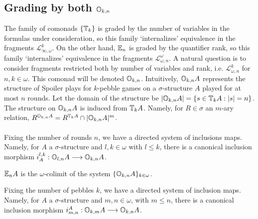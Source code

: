 \subsection{Grading by both ${\mathbb{O}_{k,n}}$}\label{sec:grading}
The family of comonads $\{{\mathbb{T}_{k}}\}$ is graded by the number of variables in the formulas under consideration, so this family `internalizes' equivalence in the fragments $\mathcal{L}^{k}_{\infty,\omega}$. On the other hand, ${\mathbb{E}_{n}}$ is graded by the quantifier rank, so this family `internalizes' equivalence in the fragments $\mathcal{L}^{\omega}_{\omega,n}$. A natural question is to consider fragments restricted both by number of variables and rank, i.e. $\mathcal{L}^{k}_{\omega,n}$ for $n,k \in \omega$. This comonad will be denoted ${\mathbb{O}_{k,n}}$. Intuitively, ${\mathbb{O}_{k,n}A}$ represents the structure of Spoiler plays for $k$-pebble games on a $\sigma$-structure $A$ played for at most $n$ rounds. Let the domain of the structure be $|{\mathbb{O}_{k,n}A}| = \{s \in {\mathbb{T}_{k}A}: |s| = n\}$. The structure on ${\mathbb{O}_{k,n}A}$ is induced from ${\mathbb{T}_{k}A}$. Namely, for $R \in \sigma$ an $m$-ary relation, $R^{{\mathbb{O}_{k,n}A}} = R^{{\mathbb{T}_{k}A}} \cap |{\mathbb{O}_{k,n}A}|^{m}$. 
\\~\\
Fixing the number of rounds $n$, we have a directed system of inclusions maps. Namely, for $A$ a $\sigma$-structure and $l,k \in \omega$ with $l \leq k$, there is a canonical inclusion morphism $i^{l,k}_{A}:{\mathbb{O}_{l,n}A} \longrightarrow {\mathbb{O}_{k,n}A}$. \\  
\begin{prop}
${\mathbb{E}_{n}A}$ is the $\omega$-colimit of the system $\{{\mathbb{O}_{k,n}A}\}_{k \in \omega}$.
\end{prop}
Fixing the number of pebbles $k$, we have a directed system of inclusion maps. Namely, for $A$ a $\sigma$-structure and $m,n \in \omega$, with $m \leq n$, there is a canonical inclusion morphism $i_{m,n}^{A}:{\mathbb{O}_{k,m}A} \longrightarrow {\mathbb{O}_{k,n}A}$. \\
